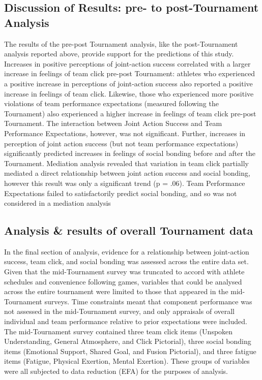 {\subsection{Discussion of Results: pre- to post-Tournament Analysis}
  The results of the pre-post Tournament analysis, like the post-Tournament analysis reported above, provide support for the predictions of this study.  Increases in positive perceptions of joint-action success correlated with a larger increase in feelings of team click pre-post Tournament: athletes who experienced a positive increase in perceptions of joint-action success also reported a positive increase in feelings of team click.  Likewise, those who experienced more positive violations of team performance expectations (measured following the Tournament) also experienced a higher increase in feelings of team click pre-post Tournament.  The interaction between Joint Action Success and Team Performance Expectations, however, was not significant. Further, increases in perception of joint action success (but not team performance expectations) significantly predicted increases in feelings of social bonding before and after the Tournament.  Mediation analysis revealed that variation in team click partially mediated a direct relationship between joint action success and social bonding, however this result was only a significant trend (p = .06).  Team Performance Expectations failed to satisfactorily predict social bonding, and so was not considered in a mediation analysis


\subsection{Analysis \& results of overall Tournament data}
In the final section of analysis, evidence for a relationship between joint-action success, team click, and social bonding was assessed across the entire data set. Given that the mid-Tournament survey was truncated to accord with athlete schedules and convenience following games, variables that could be analysed across the entire tournament were limited to those that appeared in the mid-Tournament surveys. Time constraints meant that component performance was not assessed in the mid-Tournament survey, and only appraisals of overall individual and team performance relative to prior expectations were included. The mid-Tournament survey contained three team click items (Unspoken Understanding, General Atmosphere, and Click Pictorial), three social bonding items (Emotional Support, Shared Goal, and Fusion Pictorial), and three fatigue items (Fatigue, Physical Exertion, Mental Exertion). These groups of variables were all subjected to data reduction (EFA) for the purposes of analysis.



}
